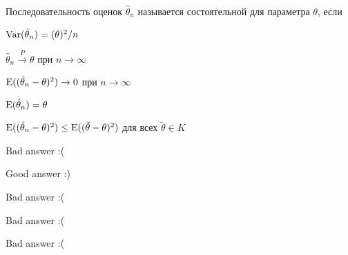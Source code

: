 
\begin{question}
Последовательность оценок \(\hat \theta_n\) называется состоятельной для
параметра \(\theta\), если
\begin{answerlist}[2]
  \item \(\operatorname{Var}(\hat \theta_n)=(\theta)^2/n\)
  \item \(\hat \theta_n \stackrel{P}{\to} \theta\) при
\(n\stackrel{}{\to} \infty\)
  \item \(\operatorname{E}((\hat \theta_n - \theta)^2) \stackrel{}{\to} 0\) при
\(n\stackrel{}{\to} \infty\)
  \item \(\operatorname{E}(\hat \theta_n)=\theta\)
  \item \(\operatorname{E}((\hat \theta_n - \theta)^2) \leq \operatorname{E}((\tilde \theta - \theta)^2)\)
для всех \(\tilde \theta \in K\)
\end{answerlist}
\end{question}

\begin{solution}
\begin{answerlist}
  \item Bad answer :(
  \item Good answer :)
  \item Bad answer :(
  \item Bad answer :(
  \item Bad answer :(
\end{answerlist}
\end{solution}

